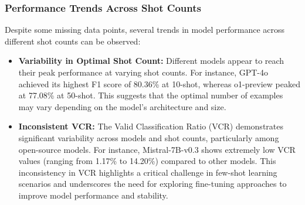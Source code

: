 \documentclass[conference]{IEEEtran}
\begin{document}

\subsubsection{Performance Trends Across Shot Counts}
Despite some missing data points, several trends in model performance across different shot counts can be observed:

\begin{itemize}
    \item \textbf{Variability in Optimal Shot Count:} Different models appear to reach their peak performance at varying shot counts. For instance, GPT-4o achieved its highest F1 score of 80.36\% at 10-shot, whereas o1-preview peaked at 77.08\% at 50-shot. This suggests that the optimal number of examples may vary depending on the model's architecture and size.
    
    \item \textbf{Inconsistent VCR:} The Valid Classification Ratio (VCR) demonstrates significant variability across models and shot counts, particularly among open-source models. For instance, Mistral-7B-v0.3 shows extremely low VCR values (ranging from 1.17\% to 14.20\%) compared to other models. This inconsistency in VCR highlights a critical challenge in few-shot learning scenarios and underscores the need for exploring fine-tuning approaches to improve model performance and stability.
\end{itemize}
\end{document}
